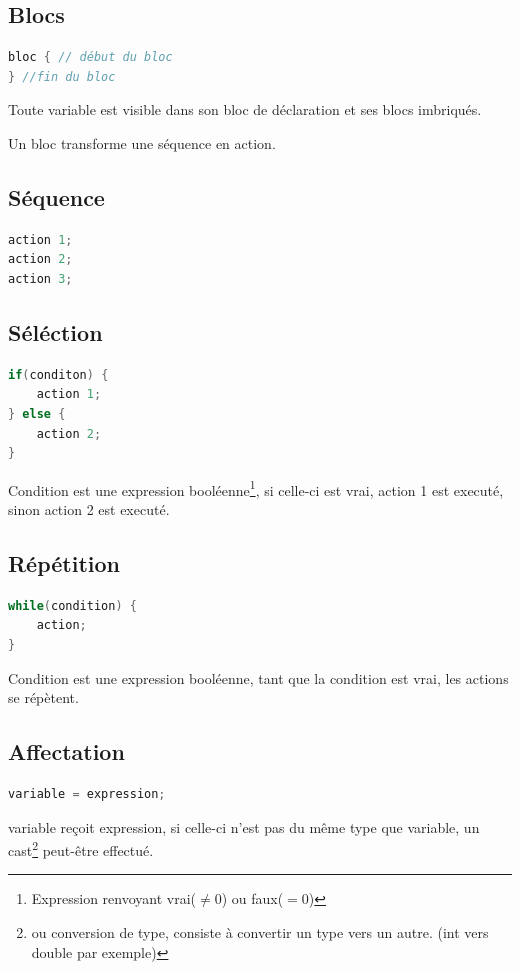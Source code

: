 \documentclass[12pt,a4paper,openany]{book}
\begin{document}
	\subsection{Blocs}
\begin{lstlisting}[language=C, caption=Syntaxe d'un bloc]
bloc { // début du bloc
} //fin du bloc
\end{lstlisting}
	Toute variable est visible dans son bloc de déclaration et ses blocs imbriqués.

	Un bloc transforme une séquence en action.

	\subsection{Séquence}
\begin{lstlisting}[language=C, caption=Syntaxe des actions]
action 1;
action 2;
action 3;
\end{lstlisting}
	\subsection{Séléction}
\begin{lstlisting}[language=C, caption=Syntaxe d'une structure de contrôle]
if(conditon) {
	action 1;
} else {
	action 2;
}
\end{lstlisting}
Condition est une expression booléenne\footnote{Expression renvoyant vrai($\neq 0$) ou faux($=0$)}, si celle-ci est vrai, action 1 est executé, sinon action 2 est executé. 

\subsection{Répétition}
\begin{lstlisting}[language=C, caption=Syntaxe de répétition]
while(condition) {
	action;
}
\end{lstlisting}
Condition est une expression booléenne, tant que la condition est vrai, les actions se répètent.

\subsection{Affectation}
\begin{lstlisting}[language=C, caption=Syntaxe d'une affectation ]
variable = expression;
\end{lstlisting}
variable reçoit expression, si celle-ci n'est pas du même type que variable, un cast\footnote{ou conversion de type, consiste à convertir un type vers un autre. (int vers double par exemple)} peut-être effectué.
\end{document}
